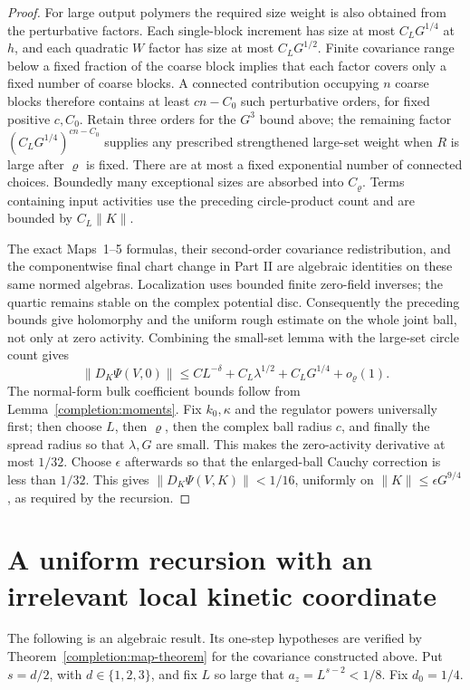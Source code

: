 \documentclass[11pt]{article}
\begin{document}
\begin{proof}
For large output polymers the required size weight is also obtained
from the perturbative factors. Each single-block increment has size at
most \(C_LG^{1/4}\) at \(h\), and each quadratic \(W\) factor has size
at most \(C_LG^{1/2}\). Finite covariance range below a fixed fraction
of the coarse block implies that each factor covers only a fixed
number of coarse blocks. A connected contribution occupying \(n\)
coarse blocks therefore contains at least \(cn-C_0\) such perturbative
orders, for fixed positive \(c,C_0\). Retain three orders for the
\(G^3\) bound above; the remaining factor
\((C_LG^{1/4})^{cn-C_0}\) supplies any prescribed strengthened
large-set weight when \(R\) is large after \(\varrho\) is fixed.
There are at most a fixed exponential number of connected choices.
Boundedly many exceptional sizes are absorbed into \(C_\varrho\).
Terms containing input activities use the preceding circle-product
count and are bounded by \(C_L\|K\|\).

The exact Maps~1--5 formulas, their second-order covariance
redistribution, and the componentwise final chart change in Part II
are algebraic identities on these same normed algebras. Localization
uses bounded finite zero-field inverses; the quartic remains stable on
the complex potential disc. Consequently the preceding bounds give
holomorphy and the uniform rough estimate on the whole joint ball,
not only at zero activity. Combining the small-set lemma with the
large-set circle count gives
\[
 \|D_K\Psi(V,0)\|
       \le CL^{-\delta}+C_L\lambda^{1/2}+C_LG^{1/4}
          +o_\varrho(1).
\]
The normal-form bulk coefficient bounds follow from
Lemma~\ref{completion:moments}. Fix \(k_0,\kappa\) and the regulator powers universally first; then
choose \(L\), then \(\varrho\), then the complex ball radius \(c\),
and finally the
spread radius so that \(\lambda,G\) are small. This makes the zero-activity derivative at most \(1/32\). Choose
\(\epsilon\) afterwards so that the enlarged-ball Cauchy correction is
less than \(1/32\). This gives \(\|D_K\Psi(V,K)\|<1/16\), uniformly
on \(\|K\|\le\epsilon G^{9/4}\), as required by the recursion.

\end{proof}

\section{A uniform recursion with an irrelevant local kinetic coordinate}
\label{frac:sec:recursion}
The following is an algebraic result. Its one-step hypotheses are verified by Theorem~\ref{completion:map-theorem} for the covariance constructed above. Put \(s=d/2\), with \(d\in\{1,2,3\}\), and fix \(L\) so
large that \(a_z=L^{s-2}<1/8\). Fix \(d_0=1/4\).
\end{document}

